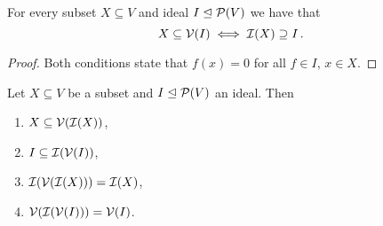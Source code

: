 \begin{lemma}
  \label{lemma: galois connection for vanishing ideals and zero sets}
  For every subset $X \subseteq V$ and ideal $I \trianglelefteq \mathcal{P}(V)$ we have that
  \[
          X \subseteq \mathcal{V}(I)
    \iff  \mathcal{I}(X) \supseteq I \,.
  \]
\end{lemma}


\begin{proof}
  Both conditions state that $f(x) = 0$ for all $f \in I$, $x \in X$.
\end{proof}


\begin{corollary}
  \label{corollary: properties of V and I}
  Let $X \subseteq V$ be a subset and $I \trianglelefteq \mathcal{P}(V)$ an ideal.
  Then
  \begin{enumerate}
    \item
      $X \subseteq \mathcal{V}(\mathcal{I}(X))$,
    \item
      $I \subseteq \mathcal{I}(\mathcal{V}(I))$,
    \item
      $\mathcal{I}(\mathcal{V}(\mathcal{I}(X))) = \mathcal{I}(X)$,
    \item
      $\mathcal{V}(\mathcal{I}(\mathcal{V}(I))) = \mathcal{V}(I)$.
  \end{enumerate}
\end{corollary}


